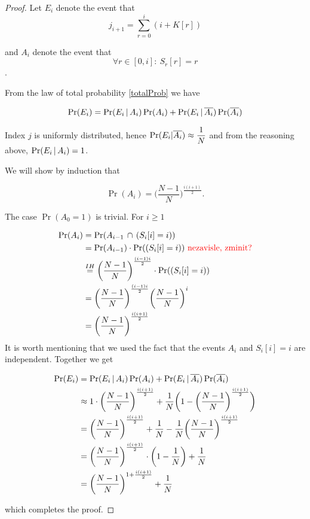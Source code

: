 	\begin{proof}
		Let $ E_{i} $ denote the event that 
		\[ j_{i+1} = \sum_{r=0}^{i}(i + K[r])\]
		
		and $ A_{i} $ denote the event that
		\[\forall r \in [0,i]: \ S_{r}[r] = r   \].
		
		From the law of total probability \ref{totalProb} we have
		
		\[ \Pr(E_{i}) = 
		\Pr(E_{i} \, | \, A_{i})\Pr(A_{i}) 
		+   \Pr(E_{i} \, | \, \overline{A_{i}})\Pr(\overline{A_{i}}) \] 
			
			
		Index $ j $ is uniformly distributed, hence $ \Pr(E_{i}|\overline{A_{i}}) \approx \dfrac{1}{N} $ and from the reasoning above, $ \Pr(E_{i} \, | \, A_{i}) = 1 $. 	
		
		We will show by induction that
		
		\[ \Pr(A_{i}) = \bigg(\dfrac{N-1}{N}\bigg)^{\frac{i(i+1)}{2}}.\]
		
		The case $ \Pr(A_{0} = 1) $ is trivial. For $ i \geq 1 $
		
		\begin{align*}
			\Pr(A_{i})  &= \Pr(A_{i-1} \, \cap \, (S_{i}[i] = i) )
					 \\ &= \Pr(A_{i-1})\cdot\Pr((S_{i}[i] = i) ) \text{ \textcolor{red}{nezavisle, zminit?}}
					 \\ &\stackrel{IH}{=} \bigg(\dfrac{N-1}{N}\bigg)^{\frac{(i-1)i}{2}}\cdot\Pr((S_{i}[i] = i) ) 
					 \\ &= 
					 \bigg(\dfrac{N-1}{N}\bigg)^{\frac{(i-1)i}{2}}
					 \bigg(\dfrac{N-1}{N}\bigg)^{i}
					 \\ &= 
					 \bigg(\dfrac{N-1}{N}\bigg)^{\frac{i(i+1)}{2}}
		\end{align*}		
		It is worth mentioning that we used the fact that the events $ A_{i} $ and $ S_{i}[i] = i $ are independent. Together we get
		
				
			\begin{align*}
				\Pr(E_{i}) &= \Pr(E_{i} \, | \, A_{i})\Pr(A_{i}) 
						    + \Pr(E_{i} \, | \, \overline{A_{i}})\Pr(\overline{A_{i}}) 
				\\ &\approx 1 \cdot \bigg(\dfrac{N-1}{N}\bigg)^{\frac{i(i+1)}{2}} 
				            + \dfrac{1}{N}\bigg(1-\bigg(\dfrac{N-1}{N}\bigg)^{\frac{i(i+1)}{2}} \bigg)
				\\ &= \bigg(\dfrac{N-1}{N}\bigg)^{\frac{i(i+1)}{2}} + \dfrac{1}{N} -
								\dfrac{1}{N}\bigg(\dfrac{N-1}{N}\bigg)^{\frac{i(i+1)}{2}}	
				\\ &= \bigg(\dfrac{N-1}{N}\bigg)^{\frac{i(i+1)}{2}} \cdot \bigg( 1 - \dfrac{1}{N}\bigg)
				+ \dfrac{1}{N}
				\\ &= \bigg(\dfrac{N-1}{N}\bigg)^{1+\frac{i(i+1)}{2}} + \dfrac{1}{N}	
			\end{align*}
			
			which completes the proof.	
		
	\end{proof}	
	

